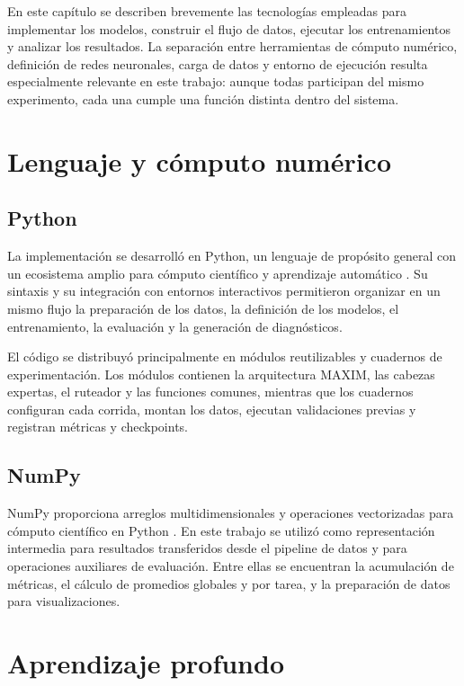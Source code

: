 \documentclass[
  11pt,
  oneside,
  english,
  spanish,
  singlespacing,
  headsepline
]{MastersDoctoralThesis}
\begin{document}
En este capítulo se describen brevemente las tecnologías empleadas para implementar los modelos, construir el flujo de datos, ejecutar los entrenamientos y analizar los resultados. La separación entre herramientas de cómputo numérico, definición de redes neuronales, carga de datos y entorno de ejecución resulta especialmente relevante en este trabajo: aunque todas participan del mismo experimento, cada una cumple una función distinta dentro del sistema.

\section{Lenguaje y cómputo numérico}

\subsection{Python}

La implementación se desarrolló en Python, un lenguaje de propósito general con un ecosistema amplio para cómputo científico y aprendizaje automático \citep{pythonDocs}. Su sintaxis y su integración con entornos interactivos permitieron organizar en un mismo flujo la preparación de los datos, la definición de los modelos, el entrenamiento, la evaluación y la generación de diagnósticos.

El código se distribuyó principalmente en módulos reutilizables y cuadernos de experimentación. Los módulos contienen la arquitectura MAXIM, las cabezas expertas, el ruteador y las funciones comunes, mientras que los cuadernos configuran cada corrida, montan los datos, ejecutan validaciones previas y registran métricas y checkpoints.

\subsection{NumPy}

NumPy proporciona arreglos multidimensionales y operaciones vectorizadas para cómputo científico en Python \citep{harris2020numpy}. En este trabajo se utilizó como representación intermedia para resultados transferidos desde el pipeline de datos y para operaciones auxiliares de evaluación. Entre ellas se encuentran la acumulación de métricas, el cálculo de promedios globales y por tarea, y la preparación de datos para visualizaciones.

\section{Aprendizaje profundo}
\end{document}
